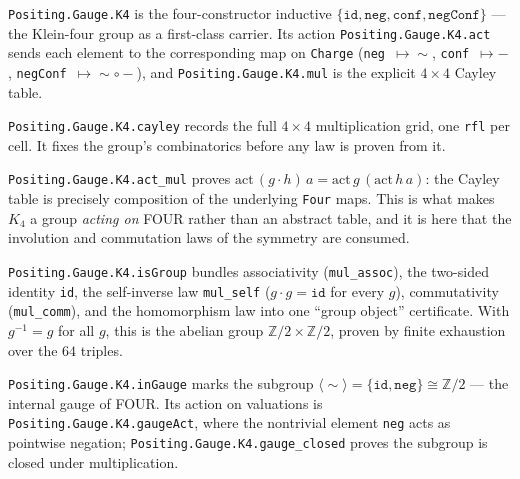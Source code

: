 \begin{proposition}\label{thm:k4-group}\leanok{}
\texttt{Positing.Gauge.K4} is the four-constructor inductive $\{\texttt{id}, \texttt{neg}, \texttt{conf}, \texttt{negConf}\}$ --- the Klein-four group as a first-class carrier. Its action \texttt{Positing.Gauge.K4.act} sends each element to the corresponding map on \texttt{Charge} (\texttt{neg}~$\mapsto\sim$, \texttt{conf}~$\mapsto-$, \texttt{negConf}~$\mapsto{\sim}\circ{-}$), and \texttt{Positing.Gauge.K4.mul} is the explicit $4\times 4$ Cayley table.
\end{proposition}
\begin{theorem}\label{thm:cayley}\leanok{}
\texttt{Positing.Gauge.K4.cayley} records the full $4\times 4$ multiplication grid, one \texttt{rfl} per cell. It fixes the group's combinatorics before any law is proven from it.
\end{theorem}
\begin{theorem}\label{thm:act-mul}\leanok{}
\texttt{Positing.Gauge.K4.act\_mul} proves $\mathrm{act}\,(g \cdot h)\,a = \mathrm{act}\,g\,(\mathrm{act}\,h\,a)$: the Cayley table is precisely composition of the underlying \texttt{Four} maps. This is what makes $K_4$ a group \emph{acting on} FOUR rather than an abstract table, and it is here that the involution and commutation laws of the symmetry are consumed.
\end{theorem}
\begin{theorem}\label{thm:k4-isgroup}\leanok{}
\texttt{Positing.Gauge.K4.isGroup} bundles associativity (\texttt{mul\_assoc}), the two-sided identity \texttt{id}, the self-inverse law \texttt{mul\_self} ($g \cdot g = \texttt{id}$ for every $g$), commutativity (\texttt{mul\_comm}), and the homomorphism law into one ``group object'' certificate. With $g^{-1} = g$ for all $g$, this is the abelian group $\mathbb{Z}/2 \times \mathbb{Z}/2$, proven by finite exhaustion over the $64$ triples.
\end{theorem}
\begin{proposition}\label{thm:gauge}\leanok{}
\texttt{Positing.Gauge.K4.inGauge} marks the subgroup $\langle\sim\rangle = \{\texttt{id}, \texttt{neg}\} \cong \mathbb{Z}/2$ --- the internal gauge of FOUR. Its action on valuations is \texttt{Positing.Gauge.K4.gaugeAct}, where the nontrivial element \texttt{neg} acts as pointwise negation; \texttt{Positing.Gauge.K4.gauge\_closed} proves the subgroup is closed under multiplication.
\end{proposition}

